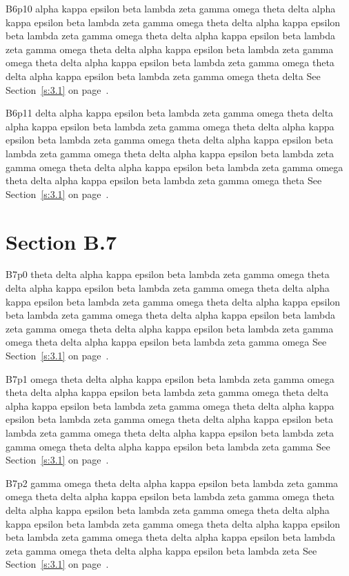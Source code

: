 B6p10 alpha kappa epsilon beta lambda zeta gamma omega theta delta alpha kappa epsilon beta lambda zeta gamma omega theta delta alpha kappa epsilon beta lambda zeta gamma omega theta delta alpha kappa epsilon beta lambda zeta gamma omega theta delta alpha kappa epsilon beta lambda zeta gamma omega theta delta alpha kappa epsilon beta lambda zeta gamma omega theta delta alpha kappa epsilon beta lambda zeta gamma omega theta delta See Section~\ref{s:3.1} on page~\pageref{s:3.1}.

B6p11 delta alpha kappa epsilon beta lambda zeta gamma omega theta delta alpha kappa epsilon beta lambda zeta gamma omega theta delta alpha kappa epsilon beta lambda zeta gamma omega theta delta alpha kappa epsilon beta lambda zeta gamma omega theta delta alpha kappa epsilon beta lambda zeta gamma omega theta delta alpha kappa epsilon beta lambda zeta gamma omega theta delta alpha kappa epsilon beta lambda zeta gamma omega theta See Section~\ref{s:3.1} on page~\pageref{s:3.1}.

\section{Section B.7}\label{s:B.7}
B7p0 theta delta alpha kappa epsilon beta lambda zeta gamma omega theta delta alpha kappa epsilon beta lambda zeta gamma omega theta delta alpha kappa epsilon beta lambda zeta gamma omega theta delta alpha kappa epsilon beta lambda zeta gamma omega theta delta alpha kappa epsilon beta lambda zeta gamma omega theta delta alpha kappa epsilon beta lambda zeta gamma omega theta delta alpha kappa epsilon beta lambda zeta gamma omega See Section~\ref{s:3.1} on page~\pageref{s:3.1}.

B7p1 omega theta delta alpha kappa epsilon beta lambda zeta gamma omega theta delta alpha kappa epsilon beta lambda zeta gamma omega theta delta alpha kappa epsilon beta lambda zeta gamma omega theta delta alpha kappa epsilon beta lambda zeta gamma omega theta delta alpha kappa epsilon beta lambda zeta gamma omega theta delta alpha kappa epsilon beta lambda zeta gamma omega theta delta alpha kappa epsilon beta lambda zeta gamma See Section~\ref{s:3.1} on page~\pageref{s:3.1}.

B7p2 gamma omega theta delta alpha kappa epsilon beta lambda zeta gamma omega theta delta alpha kappa epsilon beta lambda zeta gamma omega theta delta alpha kappa epsilon beta lambda zeta gamma omega theta delta alpha kappa epsilon beta lambda zeta gamma omega theta delta alpha kappa epsilon beta lambda zeta gamma omega theta delta alpha kappa epsilon beta lambda zeta gamma omega theta delta alpha kappa epsilon beta lambda zeta See Section~\ref{s:3.1} on page~\pageref{s:3.1}.

